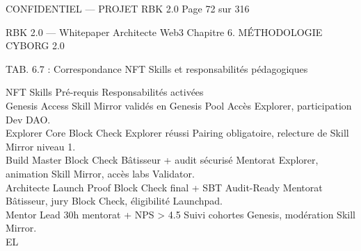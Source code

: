 \vspace{0.5em}
\begin{confidential}CONFIDENTIEL — PROJET RBK 2.0                                            Page 72 sur 316\end{confidential}
RBK 2.0 — Whitepaper Architecte Web3                                                                                Chapitre 6. MÉTHODOLOGIE CYBORG 2.0\\
\vspace{0.5em}
\vspace{0.5em}
\begin{center}\begin{tabular}TAB. 6.7 : Correspondance NFT Skills et responsabilités pédagogiques\end{tabular}\end{center}
\vspace{0.5em}
\vspace{0.5em}
NFT Skills                   Pré-requis                                   Responsabilités activées\\
Genesis Access               Skill Mirror validés en Genesis Pool         Accès Explorer, participation Dev DAO.\\
Explorer Core                Block Check Explorer réussi                  Pairing obligatoire, relecture de Skill Mirror niveau 1.\\
Build Master                 Block Check Bâtisseur + audit sécurisé       Mentorat Explorer, animation Skill Mirror, accès labs Validator.\\
Architecte Launch Proof      Block Check final + SBT Audit-Ready          Mentorat Bâtisseur, jury Block Check, éligibilité Launchpad.\\
Mentor Lead                  30h mentorat + NPS \textgreater{} 4.5                     Suivi cohortes Genesis, modération Skill Mirror.\\
\vspace{0.5em}
\vspace{0.5em}
\vspace{0.5em}
\vspace{0.5em}
EL\\

